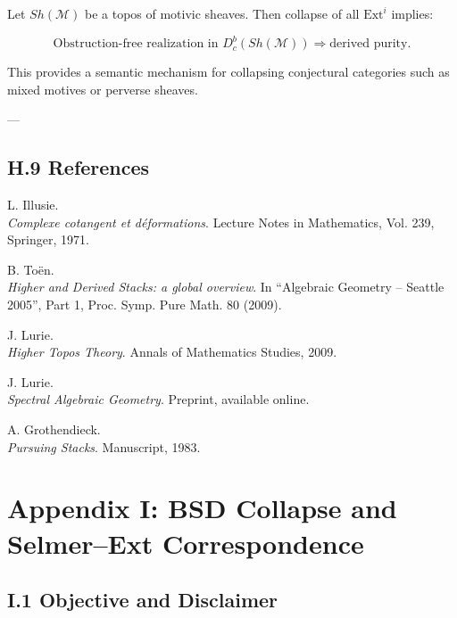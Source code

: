 \documentclass[11pt]{article}
\begin{document}
Let $Sh(\mathcal{M})$ be a topos of motivic sheaves.  
Then collapse of all $\mathrm{Ext}^i$ implies:

\[
\text{Obstruction-free realization in } D^b_c(Sh(\mathcal{M})) \Rightarrow \text{derived purity}.
\]

This provides a semantic mechanism for collapsing conjectural categories such as mixed motives or perverse sheaves.

---

\subsection*{H.9 References}

\begin{thebibliography}{9}

L. Illusie.\\
\textit{Complexe cotangent et déformations}.  
Lecture Notes in Mathematics, Vol. 239, Springer, 1971.

B. Toën.\\
\textit{Higher and Derived Stacks: a global overview}.  
In “Algebraic Geometry – Seattle 2005”, Part 1, Proc. Symp. Pure Math. 80 (2009).

J. Lurie.\\
\textit{Higher Topos Theory}.  
Annals of Mathematics Studies, 2009.

J. Lurie.\\
\textit{Spectral Algebraic Geometry}.  
Preprint, available online.

A. Grothendieck.\\
\textit{Pursuing Stacks}.  
Manuscript, 1983.

\end{thebibliography}




\section*{Appendix I: BSD Collapse and Selmer–Ext Correspondence}

\subsection*{I.1 Objective and Disclaimer}
\end{document}

